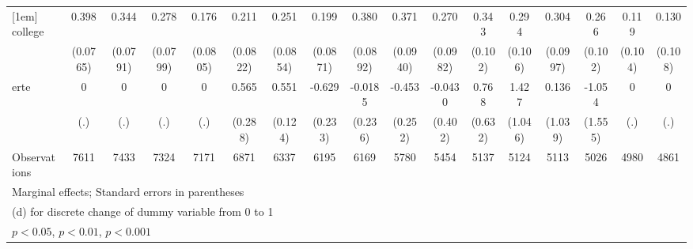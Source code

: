 {\begin{tabular}{l*{16}{c}}
[1em]
college             &       0.398\sym{***}&       0.344\sym{***}&       0.278\sym{***}&       0.176\sym{*}  &       0.211\sym{*}  &       0.251\sym{**} &       0.199\sym{*}  &       0.380\sym{***}&       0.371\sym{***}&       0.270\sym{**} &       0.343\sym{***}&       0.294\sym{**} &       0.304\sym{**} &       0.266\sym{**} &       0.119         &       0.130         \\
                    &    (0.0765)         &    (0.0791)         &    (0.0799)         &    (0.0805)         &    (0.0822)         &    (0.0854)         &    (0.0871)         &    (0.0892)         &    (0.0940)         &    (0.0982)         &     (0.102)         &     (0.106)         &    (0.0997)         &     (0.102)         &     (0.104)         &     (0.108)         \\
[1em]
erte                &           0         &           0         &           0         &           0         &       0.565\sym{*}  &       0.551\sym{***}&      -0.629\sym{**} &     -0.0185         &      -0.453         &     -0.0430         &       0.768         &       1.427         &       0.136         &      -1.054         &           0         &           0         \\
                    &         (.)         &         (.)         &         (.)         &         (.)         &     (0.288)         &     (0.124)         &     (0.233)         &     (0.236)         &     (0.252)         &     (0.402)         &     (0.632)         &     (1.046)         &     (1.039)         &     (1.555)         &         (.)         &         (.)         \\
\hline
Observations        &        7611         &        7433         &        7324         &        7171         &        6871         &        6337         &        6195         &        6169         &        5780         &        5454         &        5137         &        5124         &        5113         &        5026         &        4980         &        4861         \\
\hline\hline
\multicolumn{17}{l}{\footnotesize Marginal effects; Standard errors in parentheses}\\
\multicolumn{17}{l}{\footnotesize  (d) for discrete change of dummy variable from 0 to 1}\\
\multicolumn{17}{l}{\footnotesize \sym{*} \(p<0.05\), \sym{**} \(p<0.01\), \sym{***} \(p<0.001\)}\\
\end{tabular}
}
